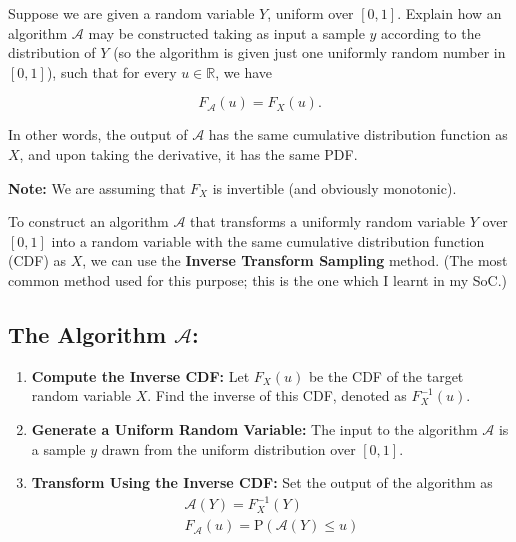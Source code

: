 \begin{tcolorbox}
    Suppose we are given a random variable $Y$, uniform over $[0, 1]$. Explain
    how an algorithm $\mathcal{A}$ may be constructed taking as input a sample
    $y$ according to the distribution of $Y$ (so the algorithm is given just one
    uniformly random number in $[0,1]$), such that for every $u \in \mathbb{R}$,
    we have

    \begin{equation*}
        F_\mathcal{A}(u) = F_X(u).
    \end{equation*}
    
    In other words, the output of $\mathcal{A}$ has the same cumulative
    distribution function as $X$, and upon taking the derivative, it has the same
    PDF.
\end{tcolorbox}


\noindent \hypertarget{3bNote}{\textbf{Note:}} We are assuming that $F_X$ is
invertible (and obviously monotonic).
\vspace{10pt}

To construct an algorithm $\mathcal{A}$ that transforms a uniformly random
variable $Y$ over $[0, 1]$ into a random variable with the same cumulative
distribution function (CDF) as $X$, we can use the \textbf{Inverse Transform
Sampling} method. (The most common method used for this purpose; this is the one
which I learnt in my SoC.)

\subsection*{The Algorithm $\mathcal{A}$:}

\begin{enumerate}
    \item \textbf{Compute the Inverse CDF:}
        Let $F_X(u)$ be the CDF of the target random variable $X$. Find the
        inverse of this CDF, denoted as $F_X^{-1}(u)$.
    \item \textbf{Generate a Uniform Random Variable:}
        The input to the algorithm $\mathcal{A}$ is a sample $y$ drawn from the
        uniform distribution over $[0, 1]$.
    \item \textbf{Transform Using the Inverse CDF:}
        Set the output of the algorithm as
        \begin{equation}
            \begin{aligned}
                \mathcal{A}(Y) = F_X^{-1}(Y) \\
                F_{\mathcal{A}}(u) = \text{P}(\mathcal{A}(Y) \leq u) \\
            \end{aligned}
            \label{e2.5}
        \end{equation}
\end{enumerate}

